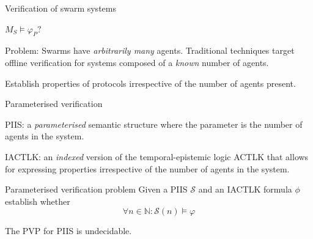 \documentclass[10pt]{beamer}
\begin{document}
\begin{frame}{Verification of swarm systems}

\begin{Large}
\begin{center}
$M_{S} \models \varphi_{P} ?$
\end{center}
\end{Large}

\vspace{2em}

\alert{ Problem:} Swarms have {\em arbitrarily many}
 agents. Traditional techniques target offline verification for
 systems composed of a {\em known} number of agents.

 \vspace{2em}

 Establish properties of protocols \alert{ irrespective of the
		number of agents present}.

\end{frame}



\begin{frame}{Parameterised verification}

	\alert{PIIS}: a {\em parameterised} semantic structure where the
	parameter is the number of agents in the system. 

	\vspace{1em}

	\alert{IACTLK}: an \emph{indexed}
	version of the  temporal-epistemic logic  ACTLK that allows for
	expressing properties irrespective of the number of agents in the
	system.

	\vspace{1em}

	\begin{block}{Parameterised verification problem}
		Given a PIIS $\mathcal{S}$ and   an IACTLK formula $\phi$
		establish whether 
		\[ \forall n \in \mathbb{N} \colon
		\mathcal{S}(n) \models \varphi \]
	\end{block}


	\vspace{1em}

	\begin{theorem}
		The PVP for PIIS is undecidable.
	\end{theorem}

\end{frame}

\end{document}
